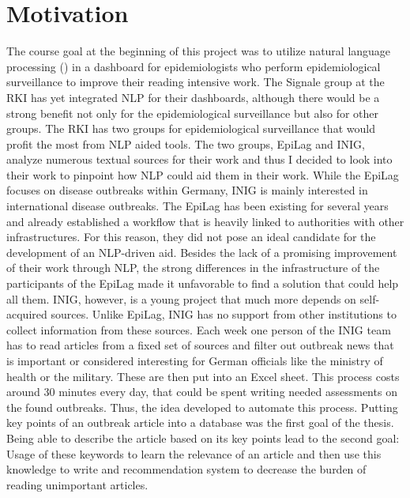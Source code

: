 \section{Motivation}
The course goal at the beginning of this project was to utilize natural language
processing () in a dashboard for epidemiologists who perform epidemiological
surveillance to improve their reading intensive work.
The Signale group at the RKI has yet integrated NLP for their dashboards, although there would be a strong benefit not only for the epidemiological surveillance but also for other groups. The RKI has two groups for epidemiological surveillance that would profit the most from NLP aided tools. The two groups,  EpiLag and INIG, analyze numerous textual sources for their work and thus I decided to look into their work to pinpoint how NLP could aid them in their work. While the EpiLag focuses on disease outbreaks within Germany, INIG is mainly interested in international disease outbreaks. The
EpiLag has been existing for several years and already established a workflow that is heavily linked to authorities with other infrastructures. For this reason, they did not pose an ideal candidate for the development of an NLP-driven aid. Besides the lack of a promising improvement of their work through NLP, the strong differences in the infrastructure of the participants of the EpiLag made it unfavorable to find a solution that could help all them.
INIG, however, is a young project that much more depends on self-acquired sources. Unlike EpiLag, INIG
has no support from other institutions to collect information from these sources.
Each week one person of the INIG team has to read articles from a fixed set of sources and filter out outbreak news that is
important or considered interesting for German officials like the ministry of health or the military. These are then put into an Excel sheet. This process costs around 30 minutes
every day, that could be spent writing needed assessments on the found outbreaks. Thus, the idea developed to automate this process. Putting key points of an outbreak article
into a database was the first goal of the thesis. Being able to describe the article based on its key points lead to the second goal: Usage of these keywords to learn the relevance of an article and then use this knowledge to write
and recommendation system to decrease the burden of reading unimportant articles.
